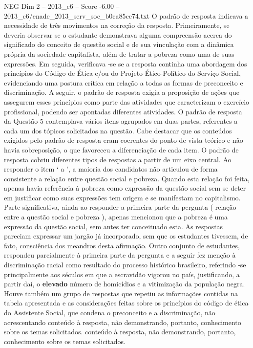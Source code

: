 \begin{textsample}{NEG Dim 2 – 2013\_c6 – Score -6.00 – 2013\_c6/enade\_2013\_serv\_soc\_b0ca85ce74.txt}
O padrão de resposta indicava a necessidade de três movimentos na correção da resposta.
Primeiramente, se deveria observar se o estudante demonstrava alguma compreensão acerca do significado do conceito de questão social e de sua vinculação com a dinâmica própria da sociedade capitalista, além de tratar a pobreza como uma de suas expressões.
Em seguida, verificava -se se a resposta continha uma abordagem dos princípios do Código de Ética e/ou do Projeto Ético-Político do Serviço Social, evidenciando uma postura crítica em relação a todas as formas de preconceito e discriminação.
A seguir, o padrão de resposta exigia a proposição de ações que assegurem esses princípios como parte das atividades que caracterizam o exercício profissional, podendo ser apontadas diferentes atividades.
O padrão de resposta da Questão 5 contemplava vários itens agrupados em duas partes, referentes a cada um dos tópicos solicitados na questão.
Cabe destacar que os conteúdos exigidos pelo padrão de resposta eram coerentes do ponto de vista teórico e não havia sobreposição, o que favoreceu a diferenciação de cada item.
O padrão de resposta cobriu diferentes tipos de respostas a partir de um eixo central.
Ao responder o item ‘ a ’, a maioria dos candidatos não articulou de forma consistente a relação entre questão social e pobreza.
Quando esta relação foi feita, apenas havia referência à pobreza como expressão da questão social sem se deter em justificar como suas expressões tem origem e se manifestam no capitalismo.
Parte significativa, ainda ao responder a primeira parte da pergunta ( relação entre a questão social e pobreza ), apenas mencionou que a pobreza é uma expressão da questão social, sem antes ter conceituado esta.
As respostas pareciam expressar um jargão já incorporado, sem que os estudantes tivessem, de fato, consciência dos meandros desta afirmação.
Outro conjunto de estudantes, respondeu parcialmente à primeira parte da pergunta e a seguir fez menção à discriminação racial como resultado do processo histórico brasileiro, referindo -se principalmente aos séculos em que a escravidão vigorou no país, justificando, a partir daí, o \textbf{elevado} número de homicídios e a vitimização da população negra.
Houve também um grupo de respostas que repetiu as informações contidas na tabela apresentada e as considerações feitas sobre os princípios do código de ética do Assistente Social, que condena o preconceito e a discriminação, não acrescentando conteúdo à resposta, não demonstrando, portanto, conhecimento sobre os temas solicitados. conteúdo à resposta, não demonstrando, portanto, conhecimento sobre os temas solicitados.

\end{textsample}
